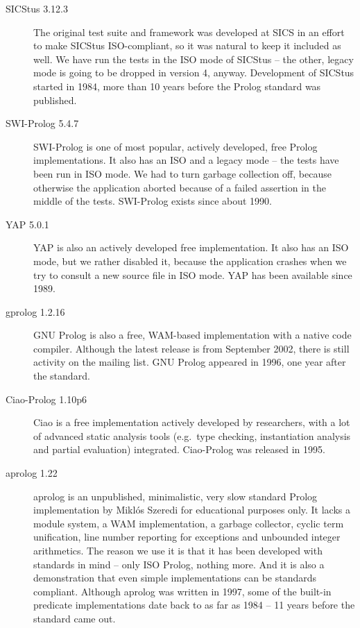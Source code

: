 \documentclass[draft]{llncs}%
\begin{document}
\begin{description}

\item[SICStus 3.12.3] %
The original test suite and framework was developed
at SICS in an effort to make SICStus \cite{sicstus-manual}
ISO-compliant, so it was natural to keep
it included as well. We have run the tests in
the ISO mode of SICStus -- the other, legacy mode is going to be dropped in
version 4, anyway. Development of SICStus started in 1984, more than 10 years
before the Prolog standard was published.

\item[SWI-Prolog 5.4.7]
SWI-Prolog \cite{Wielemaker:03b,swipl-manual}
is one of most popular, actively developed, free Prolog
implementations. It also has an ISO and a legacy mode -- the tests have been
run in ISO mode. We had to turn garbage collection off, because otherwise the
application aborted because of a failed assertion in the middle of the tests.
SWI-Prolog exists since about 1990.

\item[YAP 5.0.1]
YAP \cite{yap-manual}
is also an actively developed free implementation. It also has an ISO
mode, but we rather disabled it, because the application crashes when we try
to consult a new source file in ISO mode. YAP has been available since 1989.

\item[gprolog 1.2.16]
GNU Prolog \cite{diaz00gnu,DBLP:conf_sac_DiazC00} is also a free, WAM-based implementation with a native code
compiler. Although the latest release is from September 2002, there is still
activity on the mailing list. GNU Prolog appeared in 1996, one year after the
standard.

\item[Ciao-Prolog 1.10p6]
Ciao \cite{ciao-manual}
is a free implementation actively developed by researchers, with a lot
of advanced static analysis tools (e.g.\ type checking, instantiation
analysis and partial evaluation) integrated. Ciao-Prolog was released in
1995.

\item[aprolog 1.22]
aprolog is an unpublished,
minimalistic, very slow standard Prolog implementation by Mikl\'os
Szeredi for educational purposes only. It lacks a module system, a WAM
implementation, a garbage collector, cyclic term unification, line number
reporting for exceptions and unbounded integer arithmetics. The reason we use
it is that it has been developed with standards in mind -- only
ISO Prolog, nothing more. And it is also a demonstration that even simple
implementations can be standards compliant. Although aprolog was written in
1997, some of the built-in predicate implementations date back to as far as
1984 -- 11 years before the standard came out.

\end{description}
\end{document}
